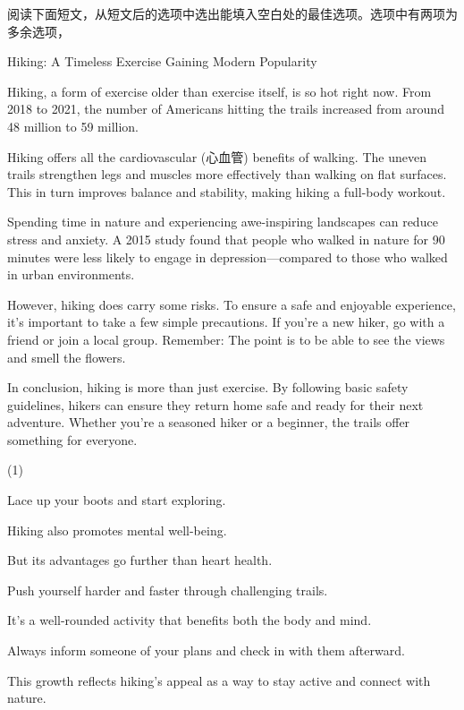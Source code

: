 \documentclass{英语试卷}
\begin{document}
\par 阅读下面短文，从短文后的选项中选出能填入空白处的最佳选项。选项中有两项为多余选项，\par
\par Hiking: A Timeless Exercise Gaining Modern Popularity\par
\par Hiking, a form of exercise older than exercise itself, is so hot right now. From 2018 to 2021, the number of Americans hitting the trails increased from around 48 million to 59 million. \par
\par Hiking offers all the cardiovascular (心血管) benefits of walking.  The uneven trails strengthen legs and muscles more effectively than walking on flat surfaces. This in turn improves balance and stability, making hiking a full-body workout.\par
\par {} Spending time in nature and experiencing awe-inspiring landscapes can reduce stress and anxiety. A 2015 study found that people who walked in nature for 90 minutes were less likely to engage in depression—compared to those who walked in urban environments.\par
\par However, hiking does carry some risks. To ensure a safe and enjoyable experience, it's important to take a few simple precautions. If you're a new hiker, go with a friend or join a local group.  Remember: The point is to be able to see the views and smell the flowers.\par
\par In conclusion, hiking is more than just exercise.  By following basic safety guidelines, hikers can ensure they return home safe and ready for their next adventure. Whether you're a seasoned hiker or a beginner, the trails offer something for everyone.\par
\begin{choices}(1)
  \item Lace up your boots and start exploring.
  \item Hiking also promotes mental well-being.
  \item But its advantages go further than heart health.
  \item Push yourself harder and faster through challenging trails.
  \item It's a well-rounded activity that benefits both the body and mind.
  \item Always inform someone of your plans and check in with them afterward.
  \item This growth reflects hiking's appeal as a way to stay active and connect with nature.
\end{choices}
\end{document}
